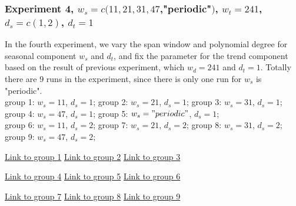 \subsubsection{Experiment 4,  
\textmd{$w_s=c(11, 21, 31, 47$,"periodic"$)$, $w_t=241$, $d_s=c(1,2)$, $d_t=1$}
}
In the fourth experiment, we vary the span window and polynomial degree for 
seasonal component $w_s$ and $d_t$, and fix the parameter for the trend 
component based on the result of previous experiment, which $w_d = 241$ and 
$d_t = 1$. Totally there are 9 runs in the experiment, since there is only one 
run for $w_s$ is "periodic".
\\
group 1: $w_s = 11$, $d_s = 1$;
group 2: $w_s = 21$, $d_s = 1$;
group 3: $w_s = 31$, $d_s = 1$;\\
group 4: $w_s = 47$, $d_s = 1$;
group 5: $w_s = "periodic"$, $d_s = 1$;\\
group 6: $w_s = 11$, $d_s = 2$;
group 7: $w_s = 21$, $d_s = 2$;
group 8: $w_s = 31$, $d_s = 2$;\\
group 9: $w_s = 47$, $d_s = 2$;
\begin{framed}
\begin{center}
  \href{../plots/a1950/E4/QQ.error.tmax.group.1.pdf}{Link to group 1} 
  \;\;\;\;\;\;\;\;\;\;
  \href{../plots/a1950/E4/QQ.error.tmax.group.2.pdf}{Link to group 2} 
  \;\;\;\;\;\;\;\;\;\;
  \href{../plots/a1950/E4/QQ.error.tmax.group.3.pdf}{Link to group 3}
\end{center}
\begin{center}
  \href{../plots/a1950/E4/QQ.error.tmax.group.4.pdf}{Link to group 4} 
  \;\;\;\;\;\;\;\;\;\;
  \href{../plots/a1950/E4/QQ.error.tmax.group.5.pdf}{Link to group 5} 
  \;\;\;\;\;\;\;\;\;\;
  \href{../plots/a1950/E4/QQ.error.tmax.group.6.pdf}{Link to group 6}
\end{center}
\begin{center}
  \href{../plots/a1950/E4/QQ.error.tmax.group.7.pdf}{Link to group 7} 
  \;\;\;\;\;\;\;\;\;\;
  \href{../plots/a1950/E4/QQ.error.tmax.group.8.pdf}{Link to group 8} 
  \;\;\;\;\;\;\;\;\;\;
  \href{../plots/a1950/E4/QQ.error.tmax.group.9.pdf}{Link to group 9}
\end{center}
\begin{center}
  \label{QQ.error.laggroup}
\end{center}
\end{framed}

